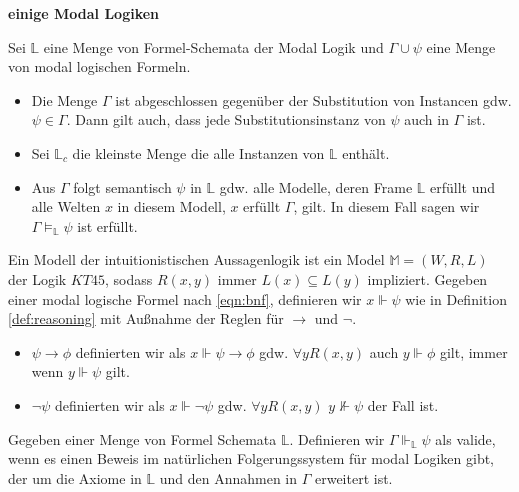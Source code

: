 \textbf{einige Modal Logiken}
\begin{definition}
	\label{def:substitution}
	Sei $\mathds{L}$ eine Menge von Formel-Schemata der Modal Logik und $\Gamma \cup {\psi}$ eine Menge von modal logischen Formeln.
	
	\begin{itemize}
		\item Die Menge $\Gamma$ ist abgeschlossen gegenüber der Substitution von Instancen gdw.  $\psi \in \Gamma$. Dann gilt auch, dass jede Substitutionsinstanz von $\psi$ auch in $\Gamma$ ist.
		\item Sei $\mathds{L}_c$ die kleinste Menge die alle Instanzen von $\mathds{L}$ enthält.
		\item Aus $\Gamma$ folgt semantisch $\psi$ in $\mathds{L}$ gdw. alle Modelle, deren Frame $\mathds{L}$ erfüllt und alle Welten $x$ in diesem Modell, $x$ erfüllt $\Gamma$, gilt.
		In diesem Fall sagen wir $\Gamma \vDash_{\mathds{L}} \psi$ ist erfüllt.
	\end{itemize}
\end{definition}
\cite[S.326]{huth2004logic}

\begin{definition}
	Ein Modell der intuitionistischen Aussagenlogik ist ein Model $\mathds{M} = (W,R,L)$ der Logik $KT45$, sodass $R(x,y)$ immer $L(x) \subseteq L(y)$ impliziert.
	Gegeben einer modal logische Formel nach \eqref{eqn:bnf}, definieren wir $x \Vdash \psi$ wie in Definition \eqref{def:reasoning} mit Außnahme der Reglen für $\rightarrow$ und $\neg$.
	\begin{itemize}
		\item $\psi \rightarrow \phi$ definierten wir als $x \Vdash \psi \rightarrow \phi$ gdw. $\forall y R(x,y)$ auch $y \Vdash \phi$ gilt, immer wenn $y \Vdash \psi$ gilt.
		\item $\neg \psi$ definierten wir als $x \Vdash \neg \psi$ gdw. $\forall y R(x,y)$ $y \nVdash \psi$ der Fall ist.
	\end{itemize}
\end{definition}
\cite[S.328]{huth2004logic}

\begin{definition}
	Gegeben einer Menge von Formel Schemata $\mathds{L}$.
	Definieren wir $\Gamma \Vdash_\mathds{L} \psi$ als valide, wenn es einen Beweis im natürlichen Folgerungssystem für modal Logiken gibt, der um die Axiome in $\mathds{L}$ und den Annahmen in $\Gamma$ erweitert ist.
\end{definition}
\cite[S.330]{huth2004logic}

